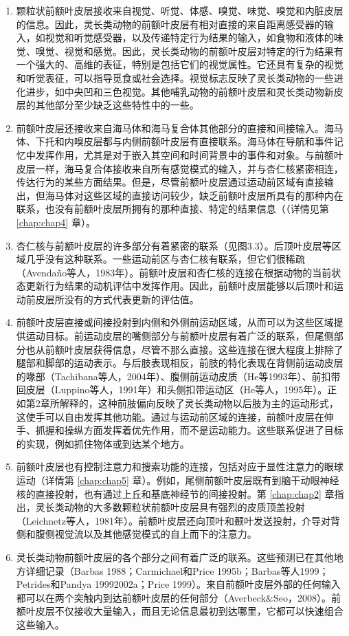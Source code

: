 \begin{enumerate}
\item 颗粒状前额叶皮层接收来自视觉、听觉、体感、嗅觉、味觉、嗅觉和内脏皮层的信息。因此，灵长类动物的前额叶皮层有相对直接的来自距离感受器的输入，如视觉和听觉感受器，以及传递特定行为结果的输入，如食物和液体的味觉、嗅觉、视觉和感觉。因此，灵长类动物的前额叶皮层对特定的行为结果有一个强大的、高维的表征，特别是包括它们的视觉属性。它还具有复杂的视觉和听觉表征，可以指导觅食或社会选择。视觉标志反映了灵长类动物的一些进化进步，如中央凹和三色视觉。其他哺乳动物的前额叶皮层和灵长类动物新皮层的其他部分至少缺乏这些特性中的一些。

\item 前额叶皮层还接收来自海马体和海马复合体其他部分的直接和间接输入。海马体、下托和内嗅皮层都与内侧前额叶皮层有直接联系。海马体在导航和事件记忆中发挥作用，尤其是对于嵌入其空间和时间背景中的事件和对象。与前额叶皮层一样，海马复合体接收来自所有感觉模式的输入，并与杏仁核紧密相连，传达行为的某些方面结果。但是，尽管前额叶皮层通过运动前区域有直接输出，但海马体对这些区域的直接访问较少，缺乏前额叶皮层所具有的那种内在联系，也没有前额叶皮层所拥有的那种直接、特定的结果信息（（详情见第 \ref{chap:chap4} 章）。


\item 杏仁核与前额叶皮层的许多部分有着紧密的联系（见图3.3）。后顶叶皮层等区域几乎没有这种联系。一些运动前区与杏仁核有联系，但它们很稀疏（Avendaño等人，1983年）。前额叶皮层和杏仁核的连接在根据动物的当前状态更新行为结果的动机评估中发挥作用。因此，前额叶皮层能够以后顶叶和运动前皮层所没有的方式代表更新的评估值。

\item 前额叶皮层直接或间接投射到内侧和外侧前运动区域，从而可以为这些区域提供运动目标。前运动皮层的嘴侧部分与前额叶皮层有着广泛的联系，但尾侧部分也从前额叶皮层获得信息，尽管不那么直接。这些连接在很大程度上排除了腿部和脚部的运动表示。与后肢表现相反，前肢的特化表现在背侧前运动皮层的喙部（Tachibana等人，2004年）、腹侧前运动皮质（He等1993年）、前扣带回皮层（Luppino等人，1991年）和头侧扣带运动区（He等人，1995年）。正如第2章所解释的，这种前肢偏向反映了灵长类动物以后肢为主的运动形式，这使手可以自由发挥其他功能。通过与运动前区域的连接，前额叶皮层在伸手、抓握和操纵方面发挥着优先作用，而不是运动能力。这些联系促进了目标的实现，例如抓住物体或到达某个地方。

\item 前额叶皮层也有控制注意力和搜索功能的连接，包括对应于显性注意力的眼球运动（详情第 \ref{chap:chap5} 章）。例如，尾侧前额叶皮层既有到脑干动眼神经核的直接投射，也有通过上丘和基底神经节的间接投射。第 \ref{chap:chap2} 章指出，灵长类动物的大多数颗粒状前额叶皮层具有强烈的皮质顶盖投射（Leichnetz等人，1981年）。前额叶皮层还向顶叶和颞叶发送投射，介导对背侧和腹侧视觉流以及其他感觉模式的自上而下的注意力。

\item 灵长类动物前额叶皮层的各个部分之间有着广泛的联系。这些预测已在其他地方详细记录（Barbas 1988；Carmichael和Price 1995b；Barbas等人1999；Petrides和Pandya 19992002a；Price 1999）。来自前额叶皮层外部的任何输入都可以在两个突触内到达前额叶皮层的任何部分（Averbeck$\&$Seo，2008）。前额叶皮层不仅接收大量输入，而且无论信息最初到达哪里，它都可以快速组合这些输入。
\end{enumerate}
\par



